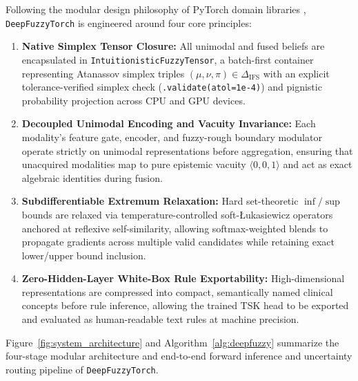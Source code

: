 \documentclass[10pt,twocolumn]{article}
\begin{document}
Following the modular design philosophy of PyTorch domain libraries
\cite{paszke2019pytorch,wang2023pypose,pineda2022theseus,%
riba2020kornia}, \texttt{DeepFuzzyTorch} is engineered around four core principles:
\begin{enumerate}[leftmargin=1.4em,itemsep=1pt,topsep=2pt]
    \item \textbf{Native Simplex Tensor Closure:} All unimodal and fused beliefs are
    encapsulated in \texttt{Intuitionistic\allowbreak Fuzzy\allowbreak Tensor}, a batch-first
    container representing Atanassov simplex triples $(\mu, \nu, \pi) \in \Delta_{\text{IFS}}$
    with an explicit tolerance-verified simplex check (\texttt{.validate(atol=1e-4)}) and
    pignistic probability projection across CPU and GPU devices.
    \item \textbf{Decoupled Unimodal Encoding and Vacuity Invariance:} Each modality's feature
    gate, encoder, and fuzzy-rough boundary modulator operate strictly on unimodal
    representations before aggregation, ensuring that unacquired modalities map to pure
    epistemic vacuity $\langle 0,0,1\rangle$ and act as exact algebraic identities during
    fusion.
    \item \textbf{Subdifferentiable Extremum Relaxation:} Hard set-theoretic $\inf/\sup$ bounds
    are relaxed via temperature-controlled soft-{\L}ukasiewicz operators anchored at reflexive
    self-similarity, allowing softmax-weighted blends to propagate gradients across multiple
    valid candidates while retaining exact lower/upper bound inclusion.
    \item \textbf{Zero-Hidden-Layer White-Box Rule Exportability:} High-dimensional
    representations are compressed into compact, semantically named clinical concepts before
    rule inference, allowing the trained TSK head to be exported and evaluated as
    human-readable text rules at machine precision.
\end{enumerate}
Figure~\ref{fig:system_architecture} and Algorithm~\ref{alg:deepfuzzy} summarize the four-stage
modular architecture and end-to-end forward inference and uncertainty routing pipeline of
\texttt{DeepFuzzyTorch}.
\end{document}
